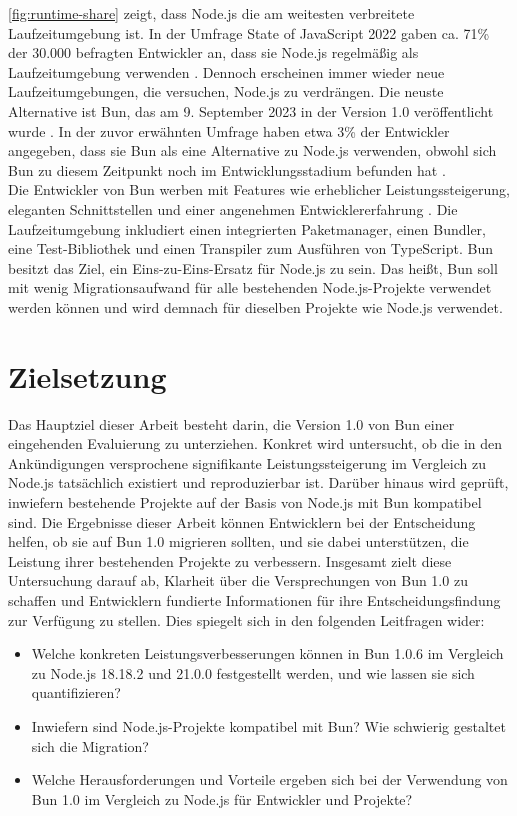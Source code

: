 \noindent
\autoref{fig:runtime-share} zeigt, dass Node.js die am weitesten verbreitete Laufzeitumgebung ist. In der Umfrage \glqq State of JavaScript 2022\grqq{} gaben ca. 71\% der 30.000 befragten Entwickler an, dass sie Node.js regelmäßig als Laufzeitumgebung verwenden \cite{Greif.2022}. Dennoch erscheinen immer wieder neue Laufzeitumgebungen, die versuchen, Node.js zu verdrängen. Die neuste Alternative ist Bun, das am 9. September 2023 in der Version 1.0 veröffentlicht wurde \cite{Sumner.2023c}. In der zuvor erwähnten Umfrage haben etwa 3\% der Entwickler angegeben, dass sie Bun als eine Alternative zu Node.js verwenden, obwohl sich Bun zu diesem Zeitpunkt noch im Entwicklungsstadium befunden hat \cite{Greif.2022}.\\

\noindent
Die Entwickler von Bun werben mit Features wie erheblicher Leistungssteigerung, eleganten Schnittstellen und einer angenehmen Entwicklererfahrung \cite{OvenSh.2023b}. Die Laufzeitumgebung inkludiert einen integrierten Paketmanager, einen Bundler, eine Test-Bibliothek und einen Transpiler zum Ausführen von TypeScript. Bun besitzt das Ziel, ein Eins-zu-Eins-Ersatz für Node.js zu sein. Das heißt, Bun soll mit wenig Migrationsaufwand für alle bestehenden Node.js-Projekte verwendet werden können und wird demnach für dieselben Projekte wie Node.js verwendet.\cite{Sumner.2023c}

\section{Zielsetzung} \label{sec:introduction-target}
Das Hauptziel dieser Arbeit besteht darin, die Version 1.0 von Bun einer eingehenden Evaluierung zu unterziehen. Konkret wird untersucht, ob die in den Ankündigungen versprochene signifikante Leistungssteigerung im Vergleich zu Node.js tatsächlich existiert und reproduzierbar ist. Darüber hinaus wird geprüft, inwiefern bestehende Projekte auf der Basis von Node.js mit Bun kompatibel sind. Die Ergebnisse dieser Arbeit können Entwicklern bei der Entscheidung helfen, ob sie auf Bun 1.0 migrieren sollten, und sie dabei unterstützen, die Leistung ihrer bestehenden Projekte zu verbessern. Insgesamt zielt diese Untersuchung darauf ab, Klarheit über die Versprechungen von Bun 1.0 zu schaffen und Entwicklern fundierte Informationen für ihre Entscheidungsfindung zur Verfügung zu stellen. Dies spiegelt sich in den folgenden Leitfragen wider:
\begin{itemize}
    \item Welche konkreten Leistungsverbesserungen können in Bun 1.0.6 im Vergleich zu Node.js 18.18.2 und 21.0.0 festgestellt werden, und wie lassen sie sich quantifizieren?
    \item Inwiefern sind Node.js-Projekte kompatibel mit Bun? Wie schwierig gestaltet sich die Migration?
    \item Welche Herausforderungen und Vorteile ergeben sich bei der Verwendung von Bun 1.0 im Vergleich zu Node.js für Entwickler und Projekte?
\end{itemize}

